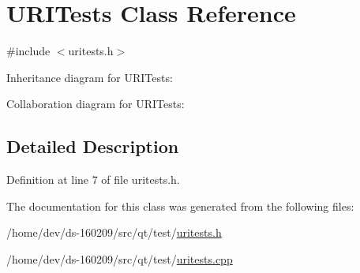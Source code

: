 \hypertarget{class_u_r_i_tests}{}\section{U\+R\+I\+Tests Class Reference}
\label{class_u_r_i_tests}


{\ttfamily \#include $<$uritests.\+h$>$}



Inheritance diagram for U\+R\+I\+Tests\+:


Collaboration diagram for U\+R\+I\+Tests\+:


\subsection{Detailed Description}


Definition at line 7 of file uritests.\+h.



The documentation for this class was generated from the following files\+:\begin{DoxyCompactItemize}
\item 
/home/dev/ds-\/160209/src/qt/test/\hyperlink{uritests_8h}{uritests.\+h}\item 
/home/dev/ds-\/160209/src/qt/test/\hyperlink{uritests_8cpp}{uritests.\+cpp}\end{DoxyCompactItemize}
